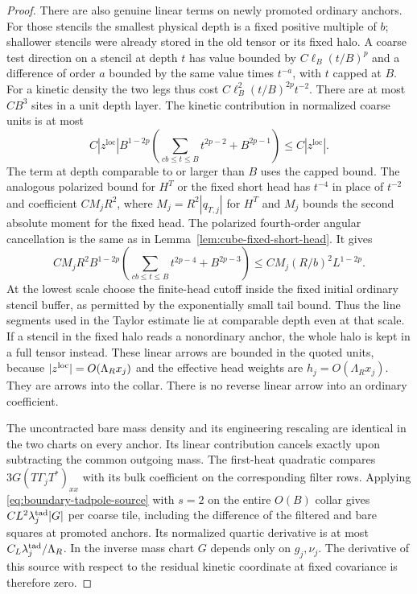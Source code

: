 \documentclass[11pt]{article}
\theoremstyle{definition}
\begin{document}
\begin{proof}
There are also genuine linear terms on newly promoted
ordinary anchors. For those stencils the smallest physical
depth is a fixed positive multiple of \(b\); shallower
stencils were already stored in the old tensor or its
fixed halo. A coarse test direction on a stencil at
depth \(t\) has value bounded by \(C\ell_B(t/B)^p\)
and a difference of order \(a\) bounded by the
same value times \(t^{-a}\), with \(t\) capped at \(B\).
For a kinetic density the two legs thus cost
\(C\ell_B^2(t/B)^{2p}t^{-2}\). There are at most
\(C B^3\) sites in a unit depth layer. The kinetic
contribution in normalized coarse units is at most
\begin{equation}
 C |z^{\mathrm{loc}}| B^{1-2p}
       \left(\sum_{c b\le t\le B}t^{2p-2}
                  + B^{2p-1}\right)
       \le C|z^{\mathrm{loc}}|.
\end{equation}
The term at depth comparable to or larger than \(B\)
uses the capped bound. The analogous polarized bound for
\(H^T\) or the fixed short head has \(t^{-4}\) in
place of \(t^{-2}\) and coefficient \(C M_jR^2\),
where \(M_j=R^2|q_{T,j}|\) for \(H^T\) and \(M_j\)
bounds the second absolute moment for the fixed head.
The polarized fourth-order angular cancellation is the
same as in Lemma~\ref{lem:cube-fixed-short-head}.
It gives
\begin{equation}
 C M_j R^2 B^{1-2p}
       \left(\sum_{c b\le t\le B}t^{2p-4}
                       +B^{2p-3}\right)
       \le C M_j(R/b)^2 L^{1-2p}.
\end{equation}
At the lowest scale choose the finite-head cutoff inside
the fixed initial ordinary stencil buffer, as permitted by
the exponentially small tail bound. Thus the line segments
used in the Taylor estimate lie at comparable depth even
at that scale. If a stencil in the fixed halo reads a
nonordinary anchor, the whole halo is kept in a full tensor
instead. These linear arrows are bounded in the quoted
units, because \(|z^{\rm loc}|=O(\Lambda_R x_j)\) and the
effective head weights are \(h_j=O(\Lambda_R x_j)\).
They are arrows into the collar. There is no reverse
linear arrow into an ordinary coefficient.

The uncontracted bare mass density and its engineering
rescaling are identical in the two charts on every anchor.
Its linear contribution cancels exactly upon subtracting
the common outgoing mass. The first-heat
quadratic compares \(3G(T\Gamma_jT^*)_{xx}\) with its bulk
coefficient on the corresponding filter rows. Applying
\eqref{eq:boundary-tadpole-source} with \(s=2\) on the entire
\(O(B)\) collar gives \(C L^2\lambda_j^{\rm tad}|G|\) per coarse
tile, including the difference of the filtered and bare squares
at promoted anchors. Its normalized quartic derivative is at most
\(C_L\lambda_j^{\rm tad}/\Lambda_R\). In the inverse mass chart \(G\) depends only on \(g_j,\nu_j\).
The derivative of this source with respect to the residual kinetic
coordinate at fixed covariance is therefore zero.


\end{proof}
\end{document}
